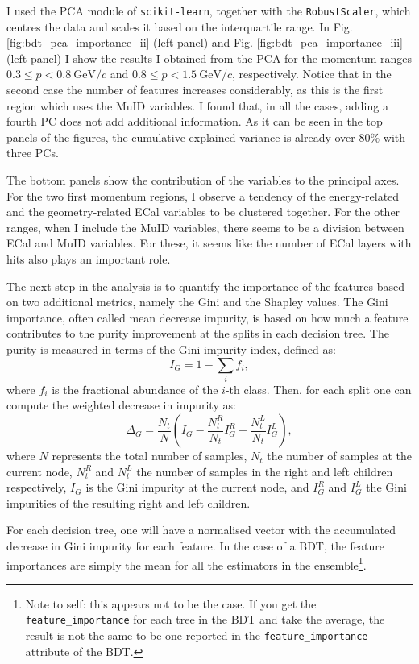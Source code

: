 I used the PCA module of \texttt{scikit-learn}, together with the \texttt{RobustScaler}, which centres the data and scales it based on the interquartile range. In Fig. \ref{fig:bdt_pca_importance_ii} (left panel) and Fig. \ref{fig:bdt_pca_importance_iii} (left panel) I show the results I obtained from the PCA for the momentum ranges $0.3 \leq p < 0.8 ~ \mathrm{GeV}/c$ and $0.8 \leq p < 1.5 ~ \mathrm{GeV}/c$, respectively. Notice that in the second case the number of features increases considerably, as this is the first region which uses the MuID variables. I found that, in all the cases, adding a fourth PC does not add additional information. As it can be seen in the top panels of the figures, the cumulative explained variance is already over $80\%$ with three PCs.

The bottom panels show the contribution of the variables to the principal axes. For the two first momentum regions, I observe a tendency of the energy-related and the geometry-related ECal variables to be clustered together. For the other ranges, when I include the MuID variables, there seems to be a division between ECal and MuID variables. For these, it seems like the number of ECal layers with hits also plays an important role.

The next step in the analysis is to quantify the importance of the features based on two additional metrics, namely the Gini and the Shapley values. The Gini importance, often called mean decrease impurity, is based on how much a feature contributes to the purity improvement at the splits in each decision tree. The purity is measured in terms of the Gini impurity index, defined as:
\begin{equation}
	I_{G} = 1 - \sum_{i} f_{i},
\end{equation}
where $f_{i}$ is the fractional abundance of the $i$-th class. Then, for each split one can compute the weighted decrease in impurity as:
\begin{equation}
	\Delta_{G} = \frac{N_{t}}{N} \left(I_{G} - \frac{N_{t}^{R}}{N_{t}} I_{G}^{R} - \frac{N_{t}^{L}}{N_{t}} I_{G}^{L}\right),
\end{equation}
where $N$ represents the total number of samples, $N_{t}$ the number of samples at the current node, $N_{t}^{R}$ and $N_{t}^{L}$ the number of samples in the right and left children respectively, $I_{G}$ is the Gini impurity at the current node, and $I_{G}^{R}$ and $I_{G}^{L}$ the Gini impurities of the resulting right and left children.

For each decision tree, one will have a normalised vector with the accumulated decrease in Gini impurity for each feature. In the case of a BDT, the feature importances are simply the mean for all the estimators in the ensemble\footnote{Note to self: this appears not to be the case. If you get the \texttt{feature_importance} for each tree in the BDT and take the average, the result is not the same to be one reported in the \texttt{feature_importance} attribute of the BDT.}.

